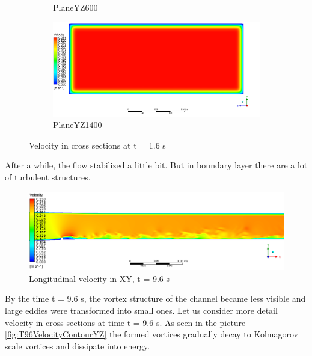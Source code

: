 \begin{figure}[H]
\begin{subfigure}{.5\textwidth}
			\caption{PlaneYZ600}
			\label{fig:T16VelocityContourYZ600}
		\end{subfigure}%
		\begin{subfigure}{.5\textwidth}
			\centering
			\includegraphics[width=1.1\linewidth]{../Assets/T16_Velocity_ContourYZ1400}
			\caption{PlaneYZ1400}
			\label{fig:T16VelocityContourYZ1400}
		\end{subfigure}
		\caption{Velocity in cross sections at t = 1.6 s}
		\label{fig:T16VelocityContourYZ}
	\end{figure}
	After a while, the flow stabilized a little bit. But in boundary layer there are a lot of turbulent structures.
	\begin{figure}[H]
		\centering
		\includegraphics[width=1\linewidth]{../Assets/T96_Velocity_ContourXY}
		\caption{Longitudinal velocity in XY, t = 9.6 s}
		\label{fig:t96velocitycontourxy}
	\end{figure}
	By the time t = 9.6 s, the vortex structure of the channel became less visible and large eddies were transformed into small ones.
	Let us consider more detail velocity in cross sections at time t = 9.6 s. As seen in the picture \ref{fig:T96VelocityContourYZ} the formed vortices gradually decay to Kolmagorov scale vortices and dissipate into energy.
